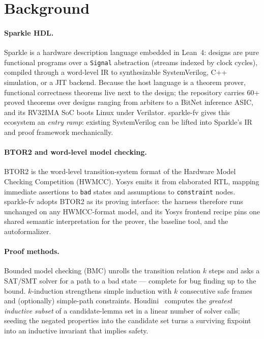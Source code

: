 \documentclass[11pt]{article}
\newcommand{\sfv}{\textsf{sparkle-fv}}
\begin{document}
\section{Background}

\paragraph{Sparkle HDL.} Sparkle is a hardware description language embedded
in Lean~4: designs are pure functional programs over a \texttt{Signal}
abstraction (streams indexed by clock cycles), compiled through a word-level
IR to synthesizable SystemVerilog, C++ simulation, or a JIT backend. Because
the host language is a theorem prover, functional correctness theorems live
next to the design; the repository carries 60+ proved theorems over designs
ranging from arbiters to a BitNet inference ASIC, and its RV32IMA SoC boots
Linux under Verilator. \sfv{} gives this ecosystem an \emph{entry ramp}:
existing SystemVerilog can be lifted into Sparkle's IR and proof framework
mechanically.

\paragraph{BTOR2 and word-level model checking.} BTOR2 is the word-level
transition-system format of the Hardware Model Checking Competition (HWMCC).
Yosys emits it from elaborated RTL, mapping immediate assertions to
\texttt{bad} states and assumptions to \texttt{constraint} nodes. \sfv{}
adopts BTOR2 as its proving interface: the harness therefore runs unchanged
on any HWMCC-format model, and its Yosys frontend recipe pins one shared
semantic interpretation for the prover, the baseline tool, and the
autoformalizer.

\paragraph{Proof methods.} Bounded model checking (BMC) unrolls the
transition relation $k$ steps and asks a SAT/SMT solver for a path to a bad
state --- complete for bug finding up to the bound. $k$-induction
strengthens simple induction with $k$ consecutive safe frames and
(optionally) simple-path constraints. Houdini~\cite{houdini} computes the
\emph{greatest inductive subset} of a candidate-lemma set in a linear number
of solver calls; seeding the negated properties into the candidate set turns
a surviving fixpoint into an inductive invariant that implies safety.
\end{document}
